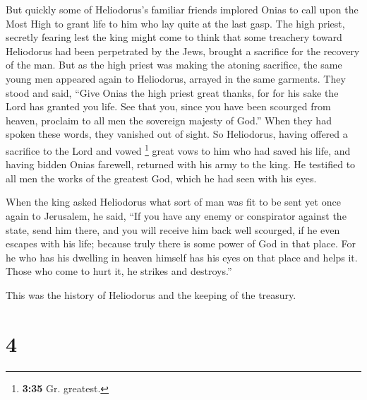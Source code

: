  But quickly some of Heliodorus's familiar friends
implored Onias to call upon the Most High to grant life to him who lay
quite at the last gasp.  The high priest, secretly
fearing lest the king might come to think that some treachery toward
Heliodorus had been perpetrated by the Jews, brought a sacrifice for the
recovery of the man.  But as the high priest was making
the atoning sacrifice, the same young men appeared again to Heliodorus,
arrayed in the same garments. They stood and said, ``Give Onias the high
priest great thanks, for for his sake the Lord has granted you life.
 See that you, since you have been scourged from heaven,
proclaim to all men the sovereign majesty of God.'' When they had spoken
these words, they vanished out of sight.  So Heliodorus,
having offered a sacrifice to the Lord and vowed \footnote{\textbf{3:35}
  Gr. greatest.} great vows to him who had saved his life, and having
bidden Onias farewell, returned with his army to the king.
 He testified to all men the works of the greatest God,
which he had seen with his eyes.

 When the king asked Heliodorus what sort of man was fit
to be sent yet once again to Jerusalem, he said,  ``If
you have any enemy or conspirator against the state, send him there, and
you will receive him back well scourged, if he even escapes with his
life; because truly there is some power of God in that place.
 For he who has his dwelling in heaven himself has his
eyes on that place and helps it. Those who come to hurt it, he strikes
and destroys.''

 This was the history of Heliodorus and the keeping of
the treasury.

\hypertarget{section-3}{%
\section{4}\label{section-3}}

